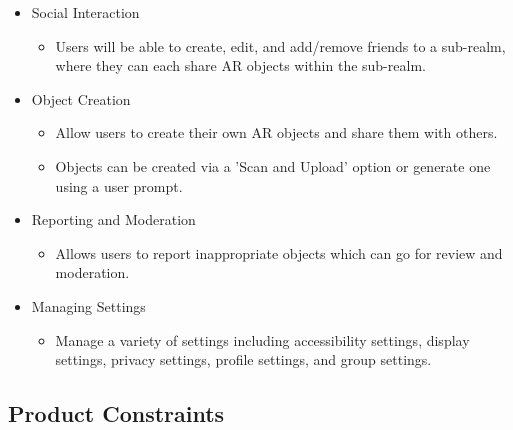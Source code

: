 \documentclass{article}
\begin{document}
\begin{itemize}
    \item Social Interaction
    \begin{itemize}
        \item Users will be able to create, edit, and add/remove friends to a sub-realm, where they can each share AR objects within the sub-realm.
    \end{itemize}

    \item Object Creation
    \begin{itemize}
        \item Allow users to create their own AR objects and share them with others.
        \item Objects can be created via a 'Scan and Upload' option or generate one using a user prompt.
    \end{itemize}

    \item Reporting and Moderation
    \begin{itemize}
        \item Allows users to report inappropriate objects which can go for review and moderation.
    \end{itemize}

    \item Managing Settings
    \begin{itemize}
        \item Manage a variety of settings including accessibility settings, display settings, privacy settings, profile settings, and group settings.
    \end{itemize}
\end{itemize}
\subsection{Product Constraints}
\end{document}
